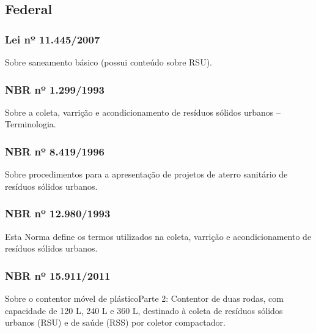 \begin{subapend}
	\subsection{Federal}
	\begin{subsubapend}
		\item \subsubsection{Lei nº 11.445/2007}	
			Sobre saneamento básico (possui conteúdo sobre RSU).
		 \subsubsection{NBR nº 1.299/1993}	
			Sobre a coleta, varrição e acondicionamento de resíduos sólidos urbanos – Terminologia.
		 \subsubsection{NBR nº 8.419/1996}
			Sobre procedimentos para a apresentação de projetos de aterro sanitário de resíduos sólidos urbanos.
		 \subsubsection{NBR nº 12.980/1993}
			Esta Norma define os termos utilizados na coleta, varrição e acondicionamento de resíduos sólidos urbanos.
		 \subsubsection{NBR nº 15.911/2011}
			Sobre o contentor móvel de plásticoParte 2: Contentor de duas rodas, com capacidade de 120 L, 240 L e 360 L, destinado à coleta de resíduos sólidos urbanos (RSU) e de saúde (RSS) por coletor compactador.
	\end{subsubapend}
\end{subapend}



